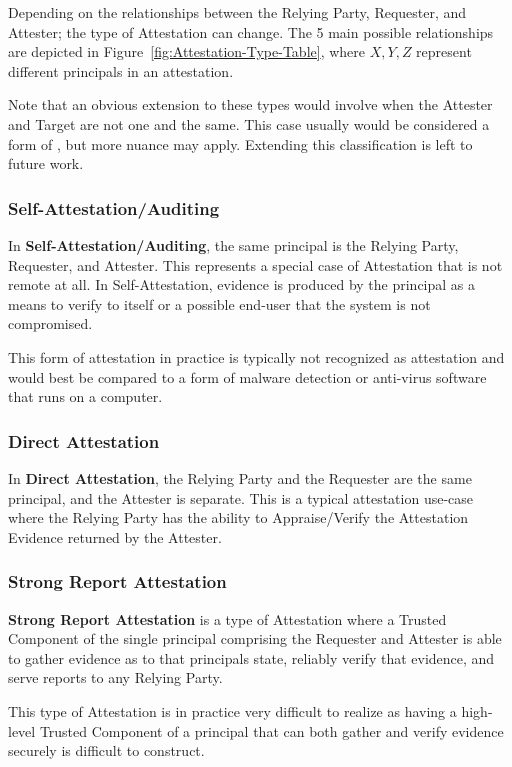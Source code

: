 \documentclass[acmsmall]{acmart}
\theoremstyle{definition}
\begin{document}
Depending on the relationships between the Relying Party, Requester, and Attester;
the type of Attestation can change. The 5 main possible relationships are depicted in
Figure~\ref{fig:Attestation-Type-Table}, where $X,Y,Z$ represent different
principals in an attestation.

Note that an obvious extension to these types would involve when the Attester and Target are not one and the same.
This case usually would be considered a form of ,
but more nuance may apply. Extending this classification is left to future work.

\subsubsection{Self-Attestation/Auditing}
In \textbf{Self-Attestation/Auditing}, the same principal is the Relying Party, Requester, and Attester. This
represents a special case of Attestation that is not remote at all.
In Self-Attestation, evidence is produced by the principal as a means to verify to itself or a possible end-user
that the system is not compromised.

This form of attestation in practice is typically not recognized as attestation and would best be compared to a
form of malware detection or anti-virus software that runs on a computer.

\subsubsection{Direct Attestation}
In \textbf{Direct Attestation}, the Relying Party and the Requester are the same principal, and the Attester is
separate. This is a typical attestation use-case where the Relying Party has the ability to Appraise/Verify
the Attestation Evidence returned by the Attester.

\subsubsection{Strong Report Attestation}
\textbf{Strong Report Attestation} is a type of Attestation where a Trusted Component of the
single principal comprising the Requester and Attester is able to gather evidence as to that
principals state, reliably verify that evidence, and serve reports to any Relying Party.

This type of Attestation is in practice very difficult to realize as having a high-level Trusted
Component of a principal that can both gather and verify evidence securely
is difficult to construct.
\end{document}
